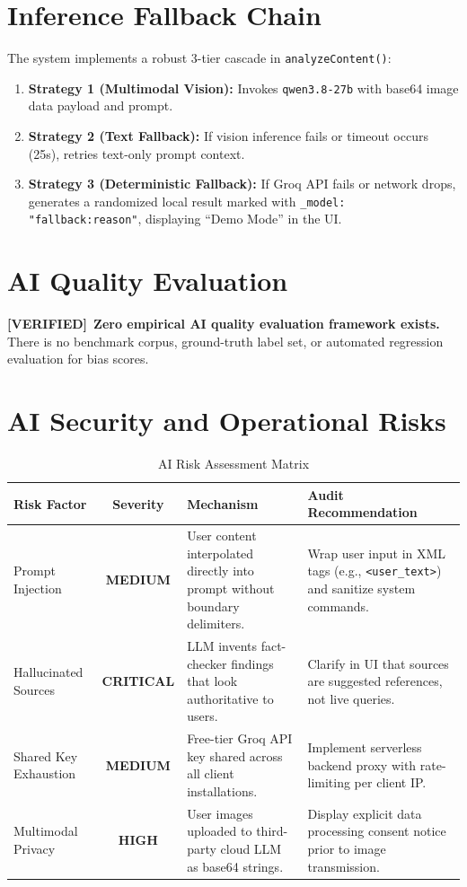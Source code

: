 \documentclass[10pt,a4paper]{report}
\newcommand{\verified}{\colorbox{green!15}{\textcolor{passGreen}{\bfseries\scriptsize [VERIFIED]}}}
\newcommand{\badgeCrit}{\colorbox{red!20}{\textcolor{critRed}{\bfseries\scriptsize CRITICAL}}}
\newcommand{\badgeHigh}{\colorbox{orange!20}{\textcolor{critRed!80!orange}{\bfseries\scriptsize HIGH}}}
\newcommand{\badgeMed}{\colorbox{yellow!30}{\textcolor{warnOrange!80!black}{\bfseries\scriptsize MEDIUM}}}
\begin{document}
\section{Inference Fallback Chain}
The system implements a robust 3-tier cascade in \texttt{analyzeContent()}:
\begin{enumerate}[leftmargin=1.5em]
    \item \textbf{Strategy 1 (Multimodal Vision):} Invokes \texttt{qwen3.8-27b} with base64 image data payload and prompt.
    \item \textbf{Strategy 2 (Text Fallback):} If vision inference fails or timeout occurs (25s), retries text-only prompt context.
    \item \textbf{Strategy 3 (Deterministic Fallback):} If Groq API fails or network drops, generates a randomized local result marked with \texttt{\_model: "fallback:reason"}, displaying ``Demo Mode'' in the UI.
\end{enumerate}

\section{AI Quality Evaluation}
\verified\ \textbf{Zero empirical AI quality evaluation framework exists.} There is no benchmark corpus, ground-truth label set, or automated regression evaluation for bias scores.

\section{AI Security and Operational Risks}

\begin{table}[htbp]
\centering
\small
\caption{AI Risk Assessment Matrix}
\begin{tabularx}{\textwidth}{l c p{4.5cm} X}
\toprule
\textbf{Risk Factor} & \textbf{Severity} & \textbf{Mechanism} & \textbf{Audit Recommendation} \\
\midrule
Prompt Injection & \badgeMed & User content interpolated directly into prompt without boundary delimiters. & Wrap user input in XML tags (e.g., \texttt{<user\_text>}) and sanitize system commands. \\
\addlinespace
Hallucinated Sources & \badgeCrit & LLM invents fact-checker findings that look authoritative to users. & Clarify in UI that sources are suggested references, not live queries. \\
\addlinespace
Shared Key Exhaustion & \badgeMed & Free-tier Groq API key shared across all client installations. & Implement serverless backend proxy with rate-limiting per client IP. \\
\addlinespace
Multimodal Privacy & \badgeHigh & User images uploaded to third-party cloud LLM as base64 strings. & Display explicit data processing consent notice prior to image transmission. \\
\bottomrule
\end{tabularx}
\end{table}
\end{document}
